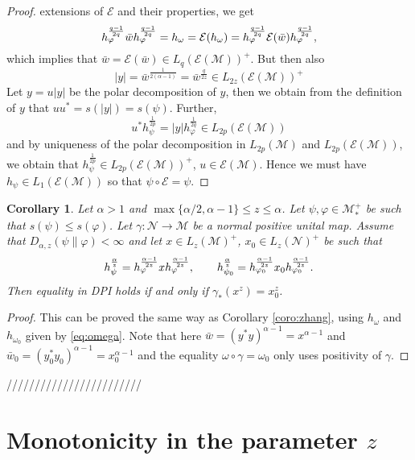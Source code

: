 \documentclass[12pt]{article}
\newtheorem{coro}[theorem]{Corollary}
\theoremstyle{definition}
\theoremstyle{remark}
\numberwithin{equation}{section}
\def\cE{\mathcal E}
\def\Me{\mathcal M}
\def\Ne{\mathcal N}
\def\ffi{\varphi}
\begin{document}
\begin{proof}
extensions of $\cE$ and their
properties, we get
\[
h_\varphi^{q-1\over2q}\bar
wh_\varphi^{q-1\over 2q}=h_\omega=\cE(h_\omega)=h_\varphi^{q-1\over 2q}\cE(\bar
w)h_\varphi^{q-1\over 2q},
\]
which implies that $\bar w=\cE(\bar w)\in L_q(\cE(\Me))^+$. But then also 
\[
|y|=\bar w^{\frac1{2(\alpha-1)}}=\bar w^{\frac{q}{2z}}\in L_{2z}(\cE(\Me))^+
\]
Let $y=u|y|$ be the polar decomposition of $y$, then we obtain from the definition of $y$ that
$uu^*=s(|y|)=s(\psi)$. Further,
\[
u^*h_\psi^{\frac1{2p}}=|y|h_\varphi^{\frac1{2q}}\in L_{2p}(\cE(\Me))
\]
and by uniqueness of the polar decomposition in $L_{2p}(\Me)$ and $L_{2p}(\cE(\Me))$, we
obtain that $h_{\psi}^{\frac1{2p}}\in L_{2p}(\cE(\Me))^+$, $u\in \cE(\Me)$. Hence we must
have $h_\psi\in L_1(\cE(\Me))$ so that $\psi\circ\cE=\psi$.


\end{proof}


\begin{coro}\label{coro:zhangge1} Let $\alpha> 1$ and $\max\{\alpha/2,\alpha-1\}\le
z\le \alpha$. Let $\psi,\ffi\in \Me_*^+$ be such that $s(\psi)\le s(\ffi)$. Let
$\gamma:\Ne\to \Me$ be a normal positive unital map. Assume that
$D_{\alpha,z}(\psi\|\ffi)<\infty$ and let $x\in L_z(\Me)^+$, $x_0\in L_z(\Ne)^+$ be such that 
\[
h_\psi^{\alpha\over z}=h_\ffi^{\alpha-1\over 2z}xh_\ffi^{\alpha-1\over 2z},\qquad
h_{\psi_0}^{\alpha\over z}=h_{\ffi_0}^{\alpha-1\over 2z}x_0h_{\ffi_0}^{\alpha-1\over 2z}.
\]
Then equality
in DPI holds if and only if $\gamma_*(x^z)=x_0^z$.


\end{coro}

\begin{proof} This can be proved the same way as Corollary \ref{coro:zhang}, using  $h_\omega$ and $h_{\omega_0}$ given by
\eqref{eq:omega}. Note that here $\bar w=(y^*y)^{\alpha-1}=x^{\alpha-1}$ and $\bar
w_0=(y^*_0y_0)^{\alpha-1}=x_0^{\alpha-1}$ and the equality $\omega\circ\gamma=\omega_0$ only uses positivity of
$\gamma$. 


\end{proof}

////////////////////////

\section{Monotonicity in the parameter $z$}
\end{document}
